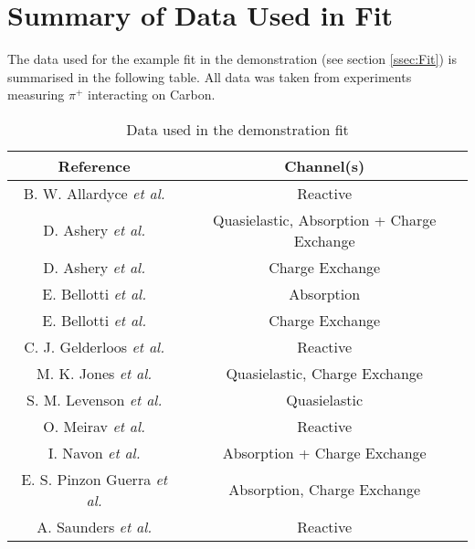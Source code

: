 \documentclass[12pt]{article}
\begin{document}
\section{Summary of Data Used in Fit}\label{app:Data_refs}
The data used for the example fit in the demonstration (see section \ref{ssec:Fit}) is summarised in the following table. All data was taken from experiments measuring $\pi^+$ interacting on Carbon.
\begin{table}[htpb]
\begin{center}
  \begin{tabular}{| c | c |}
  \hline
  Reference & Channel(s)\\  
  \hline	
  \hline
  B. W. Allardyce \textit{et al.}\cite{Allardyce} & Reactive \\
  \hline
  D. Ashery \textit{et al.}\cite{Ashery_1} & Quasielastic, Absorption + Charge Exchange \\ 
  \hline
  D. Ashery \textit{et al.}\cite{Ashery_2} & Charge Exchange \\ 
  \hline
  E. Bellotti \textit{et al.}\cite{Bellotti_1} & Absorption \\ 
  \hline
  E. Bellotti \textit{et al.}\cite{Bellotti_2} & Charge Exchange \\ 
  \hline  
  C. J. Gelderloos \textit{et al.}\cite{Gelderloos} & Reactive \\
  \hline  
  M. K. Jones \textit{et al.}\cite{Jones} & Quasielastic, Charge Exchange \\ 
  \hline
  S. M. Levenson \textit{et al.}\cite{Levenson} & Quasielastic \\
  \hline
  O. Meirav \textit{et al.}\cite{Meirav} & Reactive \\
  \hline
  I. Navon \textit{et al.}\cite{Navon} & Absorption + Charge Exchange \\
  \hline
  E. S. Pinzon Guerra \textit{et al.}\cite{DUET} & Absorption, Charge Exchange \\
  \hline
  A. Saunders \textit{et al.}\cite{Saunders} & Reactive \\
  \hline  
  \end{tabular}
\end{center}
\caption{Data used in the demonstration fit}\label{tab:fit_data}
\end{table}


%
\end{document}
